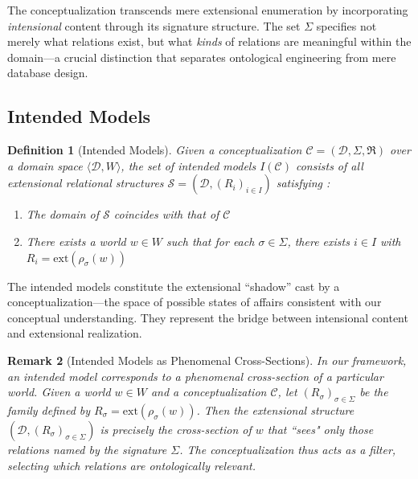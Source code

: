 \documentclass[12pt,a4paper]{article}
\newtheorem{definition}{Definition}[section]
\newtheorem{remark}[definition]{Remark}
\newcommand{\domain}{\mathcal{D}}
\newcommand{\concept}{\mathcal{C}}
\newcommand{\intrel}{\mathfrak{R}}
\begin{document}
The conceptualization transcends mere extensional enumeration by incorporating \emph{intensional} content through its signature structure. The set $\Sigma$ specifies not merely what relations exist, but what \emph{kinds} of relations are meaningful within the domain---a crucial distinction that separates ontological engineering from mere database design.

\subsection{Intended Models}

\begin{definition}[Intended Models]
Given a conceptualization $\concept = (\domain, \Sigma, \intrel)$ over a domain space $\langle \domain, W \rangle$, the set of \emph{intended models} $I(\concept)$ consists of all extensional relational structures $\mathcal{S} = (\domain, (R_i)_{i\in I})$ satisfying \citep[following][]{guarino2009}:
\begin{enumerate}
    \item The domain of $\mathcal{S}$ coincides with that of $\concept$
    \item There exists a world $w \in W$ such that for each $\sigma \in \Sigma$, there exists $i\in I$ with $R_i = \mathrm{ext}(\rho_\sigma(w))$
\end{enumerate}
\end{definition}

The intended models constitute the extensional ``shadow'' cast by a conceptualization---the space of possible states of affairs consistent with our conceptual understanding. They represent the bridge between intensional content and extensional realization.

\begin{remark}[Intended Models as Phenomenal Cross-Sections]
In our framework, an intended model corresponds to a phenomenal cross-section of a particular world. Given a world $w \in W$ and a conceptualization $\concept$, let $(R_\sigma)_{\sigma\in\Sigma}$ be the family defined by $R_\sigma=\mathrm{ext}(\rho_\sigma(w))$. Then the extensional structure $(\domain,(R_\sigma)_{\sigma\in\Sigma})$ is precisely the cross-section of $w$ that ``sees" only those relations named by the signature $\Sigma$. The conceptualization thus acts as a \emph{filter}, selecting which relations are ontologically relevant.
\end{remark}
\end{document}
